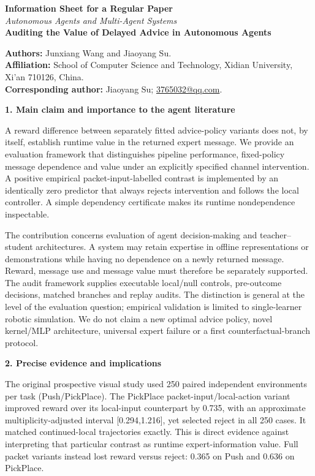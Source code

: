 \documentclass[11pt,a4paper]{article}
\begin{document}
\begin{center}\textbf{Information Sheet for a Regular Paper}\\
\emph{Autonomous Agents and Multi-Agent Systems}\\[6pt]
\textbf{Auditing the Value of Delayed Advice in Autonomous Agents}\end{center}
\textbf{Authors:} Junxiang Wang and Jiaoyang Su.\\
\textbf{Affiliation:} School of Computer Science and Technology, Xidian University, Xi'an 710126, China.\\
\textbf{Corresponding author:} Jiaoyang Su; \href{mailto:3765032@qq.com}{3765032@qq.com}.

\textbf{1. Main claim and importance to the agent literature}

A reward difference between separately fitted advice-policy variants does not, by itself, establish runtime value in the returned expert message. We provide an evaluation framework that distinguishes pipeline performance, fixed-policy message dependence and value under an explicitly specified channel intervention. A positive empirical packet-input-labelled contrast is implemented by an identically zero predictor that always rejects intervention and follows the local controller. A simple dependency certificate makes its runtime nondependence inspectable.

The contribution concerns evaluation of agent decision-making and teacher--student architectures. A system may retain expertise in offline representations or demonstrations while having no dependence on a newly returned message. Reward, message use and message value must therefore be separately supported. The audit framework supplies executable local/null controls, pre-outcome decisions, matched branches and replay audits. The distinction is general at the level of the evaluation question; empirical validation is limited to single-learner robotic simulation. We do not claim a new optimal advice policy, novel kernel/MLP architecture, universal expert failure or a first counterfactual-branch protocol.

\textbf{2. Precise evidence and implications}

The original prospective visual study used 250 paired independent environments per task (Push/PickPlace). The PickPlace packet-input/local-action variant improved reward over its local-input counterpart by 0.735, with an approximate multiplicity-adjusted interval [0.294,1.216], yet selected reject in all 250 cases. It matched continued-local trajectories exactly. This is direct evidence against interpreting that particular contrast as runtime expert-information value. Full packet variants instead lost reward versus reject: 0.365 on Push and 0.636 on PickPlace.
\end{document}
